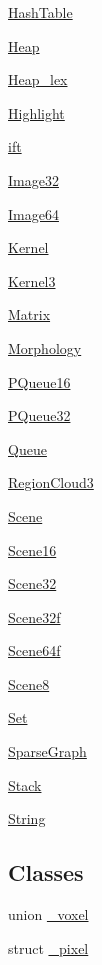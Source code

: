 \begin{DoxyCompactItemize}
\hyperlink{namespacegft_1_1HashTable}{Hash\-Table}
\item 
\hyperlink{namespacegft_1_1Heap}{Heap}
\item 
\hyperlink{namespacegft_1_1Heap__lex}{Heap\-\_\-lex}
\item 
\hyperlink{namespacegft_1_1Highlight}{Highlight}
\item 
\hyperlink{namespacegft_1_1ift}{ift}
\item 
\hyperlink{namespacegft_1_1Image32}{Image32}
\item 
\hyperlink{namespacegft_1_1Image64}{Image64}
\item 
\hyperlink{namespacegft_1_1Kernel}{Kernel}
\item 
\hyperlink{namespacegft_1_1Kernel3}{Kernel3}
\item 
\hyperlink{namespacegft_1_1Matrix}{Matrix}
\item 
\hyperlink{namespacegft_1_1Morphology}{Morphology}
\item 
\hyperlink{namespacegft_1_1PQueue16}{P\-Queue16}
\item 
\hyperlink{namespacegft_1_1PQueue32}{P\-Queue32}
\item 
\hyperlink{namespacegft_1_1Queue}{Queue}
\item 
\hyperlink{namespacegft_1_1RegionCloud3}{Region\-Cloud3}
\item 
\hyperlink{namespacegft_1_1Scene}{Scene}
\item 
\hyperlink{namespacegft_1_1Scene16}{Scene16}
\item 
\hyperlink{namespacegft_1_1Scene32}{Scene32}
\item 
\hyperlink{namespacegft_1_1Scene32f}{Scene32f}
\item 
\hyperlink{namespacegft_1_1Scene64f}{Scene64f}
\item 
\hyperlink{namespacegft_1_1Scene8}{Scene8}
\item 
\hyperlink{namespacegft_1_1Set}{Set}
\item 
\hyperlink{namespacegft_1_1SparseGraph}{Sparse\-Graph}
\item 
\hyperlink{namespacegft_1_1Stack}{Stack}
\item 
\hyperlink{namespacegft_1_1String}{String}
\end{DoxyCompactItemize}
\subsection*{Classes}
\begin{DoxyCompactItemize}
\item 
union \hyperlink{uniongft_1_1__voxel}{\-\_\-voxel}
\item 
struct \hyperlink{structgft_1_1__pixel}{\-\_\-pixel}
\end{DoxyCompactItemize}
